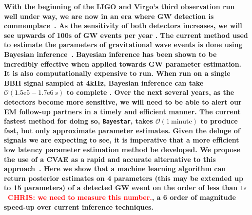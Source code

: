\documentclass[%
showpacs,
 amsmath,amssymb,
 aps,
 twocolumn,
 prl,
 reprint,
floatfix,
]{revtex4-1}
\newcommand{\chris}[1]{\textbf{\textcolor{red}{CHRIS: #1}}}
\begin{document}
%
%
%
\textbf{ 
%
%
With the beginning of the \ac{LIGO} and
Virgo's third observation run well under way, we are now in an era where
\ac{GW} detection is commonplace~\cite{PhysRevLett.116.061102,
PhysRevX.6.041015,PhysRevLett.119.161101}. As the sensitivity of both detectors
increases, we will see upwards of 100s of \ac{GW} events per year \cite{1409.7215}.  The current
method used to estimate the parameters of gravitational wave events is done
using Bayesian inference~\cite{1409.7215}.
%
%
Bayesian inference has been shown to be incredibly effective when 
applied towards \ac{GW} parameter estimation. It is also computationally expensive 
to run. When run on a single \ac{BBH} signal sampled at 4kHz, Bayesian 
inference can take $\mathcal{O}(1.5\textrm{e}5 - 1.7\textrm{e}6\: s)$ to complete \cite{1409.7215}. 
Over the next several years, as the detectors become more sensitive, we will 
need to be able to alert our \ac{EM} follow-up partners in a timely 
and efficient manner. The current fastest method for doing so, \texttt{Bayestar}, 
takes $\mathcal{O}(1\: \textrm{minute})$ to produce fast, but only approximate parameter estimates. 
Given the deluge of signals we are expecting to see, 
it is imperative that a more efficient low latency parameter estimation 
method be developed. We propose the use of a \ac{CVAE} as a rapid and accurate alternative to this
approach~\cite{1904.06264,1812.04405}. 
%
%
Here we show that a machine learning algorithm can return
posterior estimates on 4 parameters (this may be extended up to 15 parameters) of a detected \ac{GW} event on the order of less
than $1s$~\chris{we need to measure this number.}, a 6 order of magnitude speed-up over
current inference techniques.}
\end{document}
